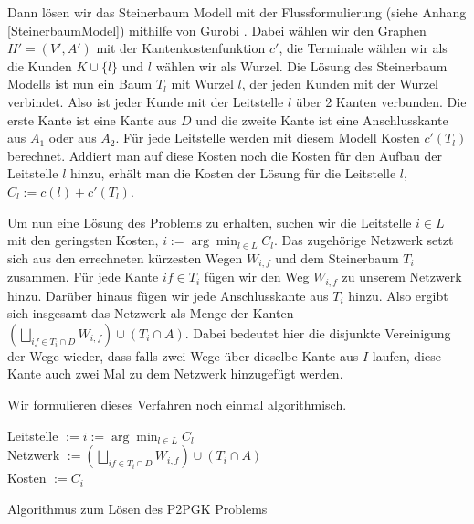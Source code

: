 \documentclass[11pt,a4paper]{article}
\theoremstyle{my_th_style1}
\begin{document}
Dann lösen wir das Steinerbaum Modell mit der Flussformulierung (siehe Anhang \eqref{SteinerbaumModel}) mithilfe von Gurobi \cite{gurobi}.
Dabei wählen wir den Graphen $H'=(V',A')$ mit der Kantenkostenfunktion $c'$, die Terminale wählen wir als die Kunden $K \cup \{l\}$ und $l$ w\"ahlen wir als Wurzel. 
Die Lösung des Steinerbaum Modells ist nun ein Baum $T_l$ mit Wurzel $l$, der jeden Kunden mit der Wurzel verbindet. 
Also ist jeder Kunde mit der Leitstelle $l$ über 2 Kanten verbunden. Die erste Kante ist eine Kante aus $D$ und die zweite Kante ist eine Anschlusskante aus $A_1$ oder aus $A_2$. 
Für jede Leitstelle werden mit diesem Modell Kosten $c'(T_l)$ berechnet. 
Addiert man auf diese Kosten noch die Kosten für den Aufbau der Leitstelle $l$ hinzu, erhält man die Kosten der Lösung für die Leitstelle \(l\), $C_l:=c(l)+c'(T_l)$.

Um nun eine Lösung des Problems zu erhalten, suchen wir die Leitstelle $i \in L$ mit den geringsten Kosten, $i:=\arg \displaystyle\min_{l \in L} C_l$.
Das zugehörige Netzwerk setzt sich aus den errechneten kürzesten Wegen  $W_{i,f}$ und dem Steinerbaum $T_i$ zusammen.
Für jede Kante $if \in T_i$ fügen wir den Weg $W_{i,f}$ zu unserem Netzwerk hinzu.
Darüber hinaus fügen wir jede Anschlusskante aus $T_i$ hinzu. Also ergibt sich insgesamt das Netzwerk als Menge der Kanten $(\bigsqcup_{if \in T_i \cap D} W_{i,f}) \cup (T_i\cap A)$.
Dabei bedeutet hier die disjunkte Vereinigung der Wege wieder, dass falls zwei Wege \"uber dieselbe Kante aus \(I\) laufen, diese Kante auch zwei Mal zu dem Netzwerk hinzugef\"ugt werden.

Wir formulieren dieses Verfahren noch einmal algorithmisch.

\vspace{0.5cm}
\begin{algorithm}[H]
	\label{alg1}
\BlankLine

	Leitstelle $:=i:=\arg \displaystyle\min_{l \in L} C_l$\\
	Netzwerk $:=(\bigsqcup_{if \in T_i \cap D}W_{i,f}) \cup (T_i\cap A)$\\
	Kosten $:=C_{i}$
	\BlankLine
\caption{Algorithmus zum Lösen des P2PGK Problems}
\end{algorithm}
\vspace{0.5cm}
\end{document}
